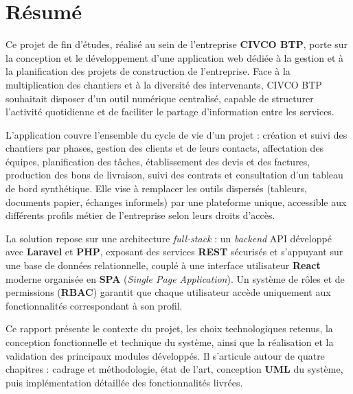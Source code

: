 \chapter*{Résumé}

Ce projet de fin d'études, réalisé au sein de l'entreprise \textbf{CIVCO BTP}, porte sur la
conception et le développement d'une application web dédiée à la gestion et à la planification
des projets de construction de l'entreprise. Face à la multiplication des chantiers et à la
diversité des intervenants, CIVCO BTP souhaitait disposer d'un outil numérique centralisé,
capable de structurer l'activité quotidienne et de faciliter le partage d'information entre
les services.

\vspace{0.35cm}

L'application couvre l'ensemble du cycle de vie d'un projet : création et suivi des chantiers
par phases, gestion des clients et de leurs contacts, affectation des équipes, planification
des tâches, établissement des devis et des factures, production des bons de livraison, suivi
des contrats et consultation d'un tableau de bord synthétique. Elle vise à remplacer les outils
dispersés (tableurs, documents papier, échanges informels) par une plateforme unique, accessible
aux différents profils métier de l'entreprise selon leurs droits d'accès.

\vspace{0.35cm}

La solution repose sur une architecture \textit{full-stack} : un \textit{backend} API
développé avec \textbf{Laravel} et \textbf{PHP}, exposant des services \textbf{REST} sécurisés
et s'appuyant sur une base de données relationnelle, couplé à une interface utilisateur
\textbf{React} moderne organisée en \textbf{SPA} (\textit{Single Page Application}). Un système
de rôles et de permissions (\textbf{RBAC}) garantit que chaque utilisateur accède uniquement
aux fonctionnalités correspondant à son profil.

\vspace{0.35cm}

Ce rapport présente le contexte du projet, les choix technologiques retenus, la conception
fonctionnelle et technique du système, ainsi que la réalisation et la validation des principaux
modules développés. Il s'articule autour de quatre chapitres : cadrage et méthodologie,
état de l'art, conception \textbf{UML} du système, puis implémentation détaillée des
fonctionnalités livrées.

